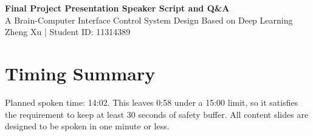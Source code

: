 \documentclass[11pt]{article}
\begin{document}
\begin{center}
{\Large\bfseries Final Project Presentation Speaker Script and Q\&A}\\
\vspace{2mm}
{A Brain-Computer Interface Control System Design Based on Deep Learning}\\
\vspace{1mm}
{Zheng Xu | Student ID: 11314389}
\end{center}

\section*{Timing Summary}
Planned spoken time: 14:02. This leaves 0:58 under a 15:00 limit, so it satisfies the requirement to keep at least 30 seconds of safety buffer. All content slides are designed to be spoken in one minute or less.
\end{document}
